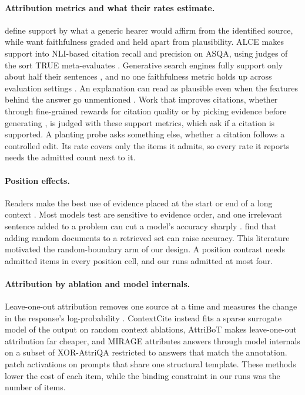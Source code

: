 \documentclass[11pt]{article}
\begin{document}
\paragraph{Attribution metrics and what their rates estimate.} \citet{rashkin2023measuring} define support by what a generic hearer would affirm from the identified source, while \citet{jacovi2020towards} want faithfulness graded and held apart from plausibility. ALCE \citep{gao2023enabling} makes support into NLI-based citation recall and precision on ASQA, using judges of the sort TRUE meta-evaluates \citep{honovich2022true}. Generative search engines fully support only about half their sentences \citep{liu2023evaluating}, and no one faithfulness metric holds up across evaluation settings \citep{zhang2024finegrained}. An explanation can read as plausible even when the features behind the answer go unmentioned \citep{turpin2023language}. Work that improves citations, whether through fine-grained rewards for citation quality \citep{huang2024training} or by picking evidence before generating \citep{slobodkin2024attribute}, is judged with these support metrics, which ask if a citation is supported. A planting probe asks something else, whether a citation follows a controlled edit. Its rate covers only the items it admits, so every rate it reports needs the admitted count next to it.

\paragraph{Position effects.} Readers make the best use of evidence placed at the start or end of a long context \citep{liu2024lost}. Most models \citet{xie2024adaptive} test are sensitive to evidence order, and one irrelevant sentence added to a problem can cut a model's accuracy sharply \citep{shi2023large}. \citet{cuconasu2024power} find that adding random documents to a retrieved set can raise accuracy. This literature motivated the random-boundary arm of our design. A position contrast needs admitted items in every position cell, and our runs admitted at most four.

\paragraph{Attribution by ablation and model internals.} Leave-one-out attribution removes one source at a time and measures the change in the response's log-probability \citep{liu2025attribot}. ContextCite \citep{cohenwang2024contextcite} instead fits a sparse surrogate model of the output on random context ablations, AttriBoT \citep{liu2025attribot} makes leave-one-out attribution far cheaper, and MIRAGE \citep{qi2024model} attributes answers through model internals on a subset of XOR-AttriQA restricted to answers that match the annotation. \citet{vandort2026how} patch activations on prompts that share one structural template. These methods lower the cost of each item, while the binding constraint in our runs was the number of items.
\end{document}
